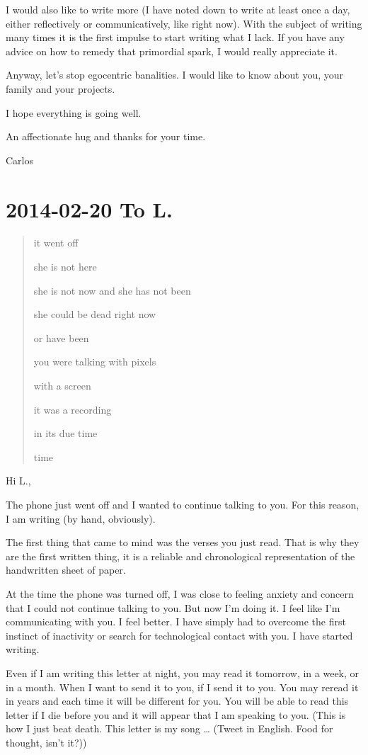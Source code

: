 \documentclass[]{book}
\begin{document}
I would also like to write more (I have noted down to write at least once a day, either reflectively or communicatively, like right now). With the subject of writing many times it is the first impulse to start writing what I lack. If you have any advice on how to remedy that primordial spark, I would really appreciate it.

Anyway, let's stop egocentric banalities. I would like to know about you, your family and your projects.

I hope everything is going well.

An affectionate hug and thanks for your time.

Carlos

\hypertarget{tolucia20140220}{%
\section*{2014-02-20 To L.}\label{tolucia20140220}}

\begin{quote}
it went off

she is not here

she is not now and she has not been

she could be dead right now

or have been

you were talking with pixels

with a screen

it was a recording

in its due time

time
\end{quote}

Hi L.,

The phone just went off and I wanted to continue talking to you. For this reason, I am writing (by hand, obviously).

The first thing that came to mind was the verses you just read. That is why they are the first written thing, it is a reliable and chronological representation of the handwritten sheet of paper.

At the time the phone was turned off, I was close to feeling anxiety and concern that I could not continue talking to you. But now I'm doing it. I feel like I'm communicating with you. I feel better. I have simply had to overcome the first instinct of inactivity or search for technological contact with you. I have started writing.

Even if I am writing this letter at night, you may read it tomorrow, in a week, or in a month. When I want to send it to you, if I send it to you. You may reread it in years and each time it will be different for you. You will be able to read this letter if I die before you and it will appear that I am speaking to you. (This is how I just beat death. This letter is my song \ldots{} (Tweet in English. Food for thought, isn't it?))
\end{document}
